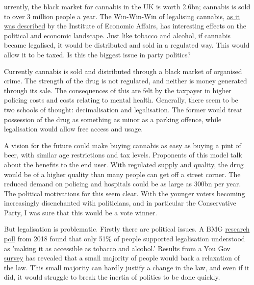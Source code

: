 
{\flushright{}}
\smallskip

   urrently, the black market for cannabis in the UK is worth \textsterling\;2.6bn;
   cannabis is sold to over 3 million people a year. The Win-Win-Win of
   legalising cannabis, \href{https://www.theguardian.com/society/2018/jun/29/legalise-cannabis-in-uk-institute-for-economic-affairs}{as it was described} by the Institute of
   Economic Affairs, has interesting effects on the political and economic
   landscape. Just like tobacco and alcohol, if cannabis became legalised,
   it would be distributed and sold in a regulated way. This would allow
   it to be taxed. Is this the biggest issue in party politics?

   Currently cannabis is sold and distributed through a black market of
   organised crime. The strength of the drug is not regulated, and neither
   is money generated through its sale. The consequences of this are felt
   by the taxpayer in higher policing costs and costs relating to mental
   health. Generally, there seem to be two schools of thought:
   decimalisation and legalisation. The former would treat possession of
   the drug as something as minor as a parking offence, while legalisation
   would allow free access and usage.

   A vision for the future could make buying cannabis as easy as buying a
   pint of beer, with similar age restrictions and tax levels. Proponents
   of this model talk about the benefits to the end user. With regulated
   supply and quality, the drug would be of a higher quality than many
   people can get off a street corner. The reduced demand on policing and
   hospitals could be as large as \textsterling\;300bn per year. The political
   motivations for this seem clear. With the younger voters becoming
   increasingly disenchanted with politicians, and in particular the
   Conservative Party, I was sure that this would be a vote winner.

   But legalisation is problematic. Firstly there are political issues. A
   BMG \href{https://www.independent.co.uk/news/uk/politics/cannabis-decriminalisation-oil-uk-cigarettes-alcohol-bmg-research-poll-a8445631.html}{research poll} from 2018 found that only 51\% of people supported
   legalisation understood as 'making it as accessible as tobacco and
   alcohol.' Results from a You Gov \href{https://www.independent.co.uk/news/uk/politics/cannabis-decriminalisation-oil-uk-cigarettes-alcohol-bmg-research-poll-a8445631.html}{survey} has revealed that a small
   majority of people would back a relaxation of the law. This small
   majority can hardly justify a change in the law, and even if it did, it
   would struggle to break the inertia of politics to be done quickly.

